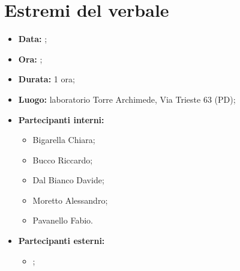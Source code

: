 \section{Estremi del verbale}
\begin{itemize}
	\item \textbf{Data:} ;
	\item \textbf{Ora:} ;
	\item \textbf{Durata:} 1 ora;
	\item \textbf{Luogo:} laboratorio Torre Archimede, Via Trieste 63 (PD);
	\item \textbf{Partecipanti interni:}
	\begin{itemize}
		\item Bigarella Chiara;
		\item Bucco Riccardo;
		\item Dal Bianco Davide;
		\item Moretto Alessandro;
		\item Pavanello Fabio.
	\end{itemize}
	\item \textbf{Partecipanti esterni:}
	\begin{itemize}
		\item \proponente;
	\end{itemize}
\end{itemize}
\newpage
